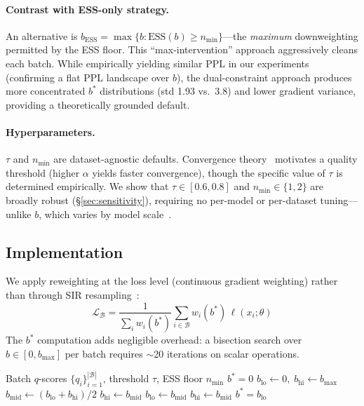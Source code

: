 \documentclass[11pt,a4paper]{article}
\newcommand{\bstar}{b^{*}}
\newcommand{\aeff}{\alpha_{\mathrm{eff}}}
\newcommand{\nmin}{n_{\min}}
\begin{document}
\paragraph{Contrast with ESS-only strategy.}
An alternative is $b_{\mathrm{ESS}}=\max\{b:\mathrm{ESS}(b)\geq\nmin\}$---the \emph{maximum} downweighting permitted by the ESS floor.
This ``max-intervention'' approach aggressively cleans each batch.
While empirically yielding similar PPL in our experiments (confirming a flat PPL landscape over $b$), the dual-constraint approach produces more concentrated $b^*$ distributions (std 1.93 vs.\ 3.8) and lower gradient variance, providing a theoretically grounded default.

\paragraph{Hyperparameters.}
$\tau$ and $\nmin$ are dataset-agnostic defaults.
Convergence theory~\citep{convergence-theory} motivates a quality threshold (higher $\alpha$ yields faster convergence), though the specific value of $\tau$ is determined empirically.
We show that $\tau\in[0.6,0.8]$ and $\nmin\in\{1,2\}$ are broadly robust (\S\ref{sec:sensitivity}), requiring no per-model or per-dataset tuning---unlike $b$, which varies by model scale~\citep{drayson-emnlp2025}.

\subsection{Implementation}
\label{sec:impl}

We apply reweighting at the loss level (continuous gradient weighting) rather than through SIR resampling~\citep{drayson-emnlp2025}:
\begin{equation}
\mathcal{L}_{\mathcal{B}} = \frac{1}{\sum_i w_i(\bstar)}\sum_{i\in\mathcal{B}} w_i(\bstar)\,\ell(x_i;\theta)
\end{equation}
The $\bstar$ computation adds negligible overhead: a bisection search over $b\in[0,b_{\max}]$ per batch requires $\sim$20 iterations on scalar operations.

\begin{algorithm}[t]
\caption{Per-batch adaptive $\bstar$}
\label{alg:bstar}
\begin{algorithmic}[1]
\Require Batch $q$-scores $\{q_i\}_{i=1}^{|\mathcal{B}|}$, threshold $\tau$, ESS floor $\nmin$
\If{$\aeff(0) \geq \tau$}
    \State \Return $\bstar = 0$
\EndIf
\State $b_{\mathrm{lo}} \gets 0,\; b_{\mathrm{hi}} \gets b_{\max}$
    \State $b_{\mathrm{mid}} \gets (b_{\mathrm{lo}} + b_{\mathrm{hi}}) / 2$
    \If{$\mathrm{ESS}(b_{\mathrm{mid}}) < \nmin$}
        \State $b_{\mathrm{hi}} \gets b_{\mathrm{mid}}$
    \ElsIf{$\aeff(b_{\mathrm{mid}}) < \tau$}
        \State $b_{\mathrm{lo}} \gets b_{\mathrm{mid}}$
    \Else
        \State $b_{\mathrm{hi}} \gets b_{\mathrm{mid}}$
    \EndIf
\EndFor
\State \Return $\bstar = b_{\mathrm{lo}}$
\end{algorithmic}
\end{algorithm}
\end{document}
